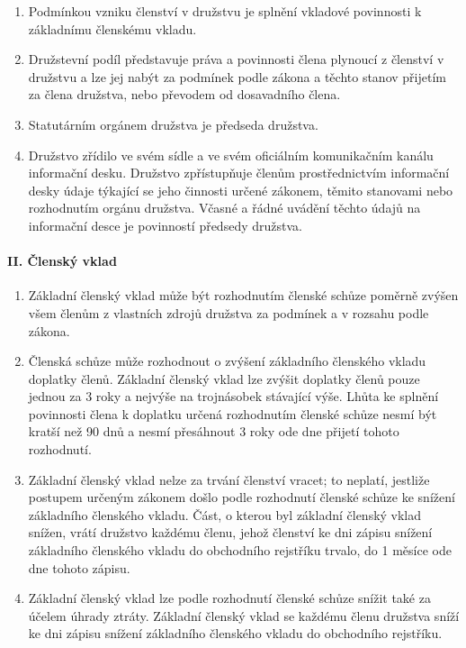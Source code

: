 \begin{enumerate}
    \item Podmínkou vzniku členství v družstvu je splnění vkladové povinnosti k základnímu členskému vkladu.
    \item Družstevní podíl představuje práva a povinnosti člena plynoucí z členství v družstvu a lze jej nabýt za podmínek podle zákona a těchto stanov přijetím za člena družstva, nebo převodem od dosavadního člena.
    \item Statutárním orgánem družstva je předseda družstva.
    \item Družstvo zřídilo ve svém sídle a ve svém oficiálním komunikačním kanálu informační desku. Družstvo zpřístupňuje členům prostřednictvím informační desky údaje týkající se jeho činnosti určené zákonem, těmito stanovami nebo rozhodnutím orgánu družstva. Včasné a řádné uvádění těchto údajů na informační desce je povinností předsedy družstva.
\end{enumerate}
\paragraph{II. Členský vklad}
\begin{enumerate}
    \item Základní členský vklad může být rozhodnutím členské schůze poměrně zvýšen všem členům z vlastních zdrojů družstva za podmínek a v rozsahu podle zákona.
    \item Členská schůze může rozhodnout o zvýšení základního členského vkladu doplatky členů. Základní členský vklad lze zvýšit doplatky členů pouze jednou za 3 roky a nejvýše na trojnásobek stávající výše. Lhůta ke splnění povinnosti člena k doplatku určená rozhodnutím členské schůze nesmí být kratší než 90 dnů a nesmí přesáhnout 3 roky ode dne přijetí tohoto rozhodnutí.
    \item Základní členský vklad nelze za trvání členství vracet; to neplatí, jestliže postupem určeným zákonem došlo podle rozhodnutí členské schůze ke snížení základního členského vkladu. Část, o kterou byl základní členský vklad snížen, vrátí družstvo každému členu, jehož členství ke dni zápisu snížení základního členského vkladu do obchodního rejstříku trvalo, do 1 měsíce ode dne tohoto zápisu.
    \item Základní členský vklad lze podle rozhodnutí členské schůze snížit také za účelem úhrady ztráty. Základní členský vklad se každému členu družstva sníží ke dni zápisu snížení základního členského vkladu do obchodního rejstříku.
\end{enumerate}

